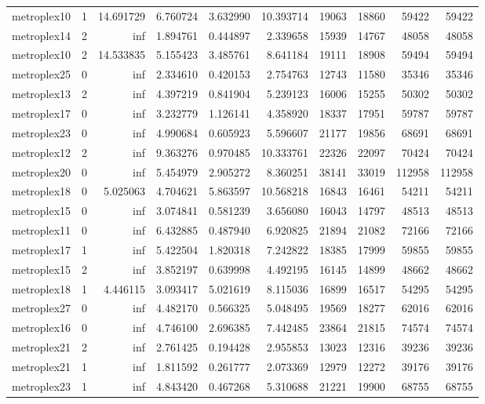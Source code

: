 \begin{longtable}{|l|r|r|r|r|r|r|r|r|r|}
metroplex10 & 1 & 14.691729 & 6.760724 & 3.632990 & 10.393714 & 19063 & 18860 & 59422 & 59422 \\
metroplex14 & 2 & inf & 1.894761 & 0.444897 & 2.339658 & 15939 & 14767 & 48058 & 48058 \\
metroplex10 & 2 & 14.533835 & 5.155423 & 3.485761 & 8.641184 & 19111 & 18908 & 59494 & 59494 \\
metroplex25 & 0 & inf & 2.334610 & 0.420153 & 2.754763 & 12743 & 11580 & 35346 & 35346 \\
metroplex13 & 2 & inf & 4.397219 & 0.841904 & 5.239123 & 16006 & 15255 & 50302 & 50302 \\
metroplex17 & 0 & inf & 3.232779 & 1.126141 & 4.358920 & 18337 & 17951 & 59787 & 59787 \\
metroplex23 & 0 & inf & 4.990684 & 0.605923 & 5.596607 & 21177 & 19856 & 68691 & 68691 \\
metroplex12 & 2 & inf & 9.363276 & 0.970485 & 10.333761 & 22326 & 22097 & 70424 & 70424 \\
metroplex20 & 0 & inf & 5.454979 & 2.905272 & 8.360251 & 38141 & 33019 & 112958 & 112958 \\
metroplex18 & 0 & 5.025063 & 4.704621 & 5.863597 & 10.568218 & 16843 & 16461 & 54211 & 54211 \\
metroplex15 & 0 & inf & 3.074841 & 0.581239 & 3.656080 & 16043 & 14797 & 48513 & 48513 \\
metroplex11 & 0 & inf & 6.432885 & 0.487940 & 6.920825 & 21894 & 21082 & 72166 & 72166 \\
metroplex17 & 1 & inf & 5.422504 & 1.820318 & 7.242822 & 18385 & 17999 & 59855 & 59855 \\
metroplex15 & 2 & inf & 3.852197 & 0.639998 & 4.492195 & 16145 & 14899 & 48662 & 48662 \\
metroplex18 & 1 & 4.446115 & 3.093417 & 5.021619 & 8.115036 & 16899 & 16517 & 54295 & 54295 \\
metroplex27 & 0 & inf & 4.482170 & 0.566325 & 5.048495 & 19569 & 18277 & 62016 & 62016 \\
metroplex16 & 0 & inf & 4.746100 & 2.696385 & 7.442485 & 23864 & 21815 & 74574 & 74574 \\
metroplex21 & 2 & inf & 2.761425 & 0.194428 & 2.955853 & 13023 & 12316 & 39236 & 39236 \\
metroplex21 & 1 & inf & 1.811592 & 0.261777 & 2.073369 & 12979 & 12272 & 39176 & 39176 \\
metroplex23 & 1 & inf & 4.843420 & 0.467268 & 5.310688 & 21221 & 19900 & 68755 & 68755 \\

\end{longtable}
